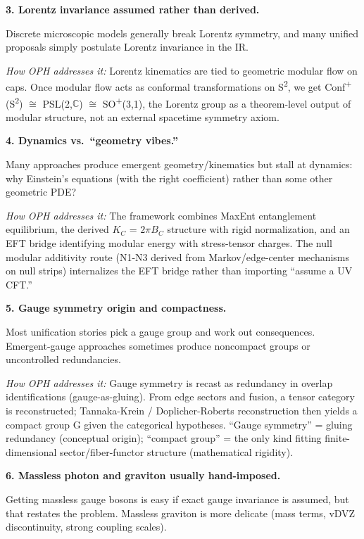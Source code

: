\documentclass[11pt,a4paper]{article}
\theoremstyle{remark}
\begin{document}
\textbf{3. Lorentz invariance assumed rather than derived.}

Discrete microscopic models generally break Lorentz symmetry, and many unified proposals simply postulate Lorentz invariance in the IR.

\emph{How OPH addresses it:} Lorentz kinematics are tied to geometric modular flow on caps. Once modular flow acts as conformal transformations on S\textsuperscript{2}, we get Conf\textsuperscript{+}(S\textsuperscript{2}) \ensuremath{\cong} PSL(2,\ensuremath{\mathbb{C}}) \ensuremath{\cong} SO\textsuperscript{+}(3,1), the Lorentz group as a theorem-level output of modular structure, not an external spacetime symmetry axiom.

\textbf{4. Dynamics vs.~``geometry vibes.''}

Many approaches produce emergent geometry/kinematics but stall at dynamics: why Einstein's equations (with the right coefficient) rather than some other geometric PDE?

\emph{How OPH addresses it:} The framework combines MaxEnt entanglement equilibrium, the derived \(K_C\) = \(2\ensuremath{\pi}B_C\) structure with rigid normalization, and an EFT bridge identifying modular energy with stress-tensor charges. The null modular additivity route (N1-N3 derived from Markov/edge-center mechanisms on null strips) internalizes the EFT bridge rather than importing ``assume a UV CFT.''

\textbf{5. Gauge symmetry origin and compactness.}

Most unification stories pick a gauge group and work out consequences. Emergent-gauge approaches sometimes produce noncompact groups or uncontrolled redundancies.

\emph{How OPH addresses it:} Gauge symmetry is recast as redundancy in overlap identifications (gauge-as-gluing). From edge sectors and fusion, a tensor category is reconstructed; Tannaka-Krein / Doplicher-Roberts reconstruction then yields a compact group G given the categorical hypotheses. ``Gauge symmetry'' = gluing redundancy (conceptual origin); ``compact group'' = the only kind fitting finite-dimensional sector/fiber-functor structure (mathematical rigidity).

\textbf{6. Massless photon and graviton usually hand-imposed.}

Getting massless gauge bosons is easy if exact gauge invariance is assumed, but that restates the problem. Massless graviton is more delicate (mass terms, vDVZ discontinuity, strong coupling scales).
\end{document}

